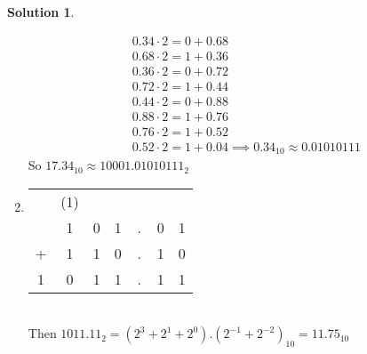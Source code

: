 \documentclass[10pt]{article}
\theoremstyle{definition}
\newtheorem{soln}{Solution}
\begin{document}
\begin{soln}
\begin{enumerate}[label=(\alph*)]
          \begin{align*}
             & 0.34\cdot 2 = 0+0.68                                       \\
             & 0.68\cdot 2 = 1+0.36                                       \\
             & 0.36\cdot 2 = 0+0.72                                       \\
             & 0.72\cdot 2 = 1+0.44                                       \\
             & 0.44\cdot 2 = 0+0.88                                       \\
             & 0.88\cdot 2 = 1+0.76                                       \\
             & 0.76\cdot 2 = 1+0.52                                       \\
             & 0.52\cdot 2 = 1+0.04\implies 0.34_{10}\approx 0.01010111 
          \end{align*}
          So $17.34_{10}\approx 10001.01010111_2$
    \item
          \begin{tabular}{ccccccc}
            ~ & (1) & ~ & ~ & ~ & ~ & ~     \\
            ~ & 1   & 0 & 1 & . & 0 & 1     \\
            + & 1   & 1 & 0 & . & 1 & 0     \\
            \hline  
            1 & 0   & 1 & 1 & . & 1 & 1   
          \end{tabular} \\
          Then $1011.11_2=(2^3+2^1+2^0).(2^{-1}+2^{-2})_{10}=11.75_{10}$
  \end{enumerate}
\end{soln}
\end{document}
